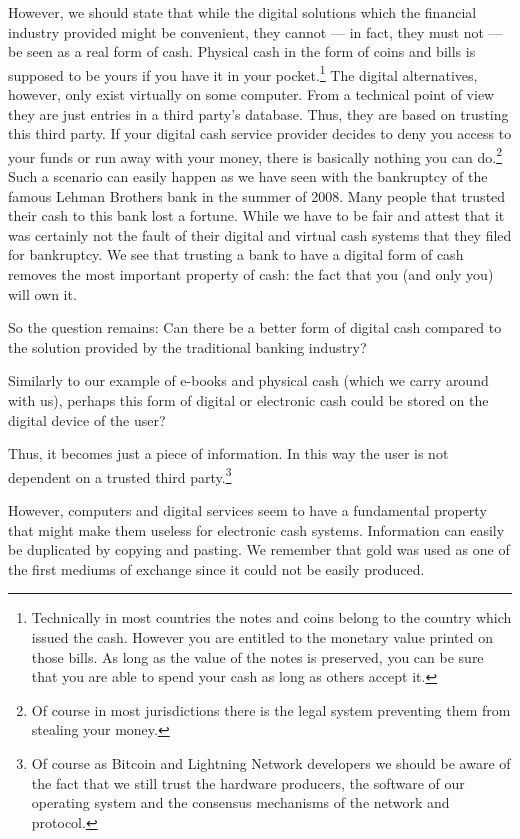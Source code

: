 \documentclass[a4paper,12pt,oneside,openany]{book}
\begin{document}
However, we should state that while the digital solutions which the financial industry provided might be convenient, they cannot --- in fact, they must not --- be seen as a real form of cash.
Physical cash in the form of coins and bills is supposed to be yours if you have it in your pocket.\footnote{Technically in most countries the notes and coins belong to the country which issued the cash. 
However you are entitled to the monetary value printed on those bills. As long as the value of the notes is preserved, you can be sure that you are able to spend your cash as long as others accept it.}
The digital alternatives, however, only exist virtually on some computer.
From a technical point of view they are just entries in a third party's database.
Thus, they are based on trusting this third party.
If your digital cash service provider decides to deny you access to your funds or run away with your money, there is basically nothing you can do.\footnote{Of course in most jurisdictions there is the legal system preventing them from stealing your money.}
Such a scenario can easily happen as we have seen with the bankruptcy of the famous Lehman Brothers bank in the summer of 2008. Many people that trusted their cash to this bank lost a fortune.
While we have to be fair and attest that it was certainly not the fault of their digital and virtual cash systems that they filed for bankruptcy.
We see that trusting a bank to have a digital form of cash removes the most important property of cash: the fact that you (and only you) will own it.

So the question remains: Can there be a better form of digital cash compared to the solution provided by the traditional banking industry? 

Similarly to our example of e-books and physical cash (which we carry around with us), perhaps this form of digital or electronic cash could be stored on the digital device of the user?

Thus, it becomes just a piece of information.
In this way the user is not dependent on a trusted third party.\footnote{Of course as Bitcoin and Lightning Network developers we should be aware of the fact that we still trust the hardware producers, the software of our operating system and the consensus mechanisms of the network and protocol.}

However, computers and digital services seem to have a fundamental property that might make them useless for electronic cash systems.
Information can easily be duplicated by copying and pasting.
We remember that gold was used as one of the first mediums of exchange since it could not be easily produced.
\end{document}
